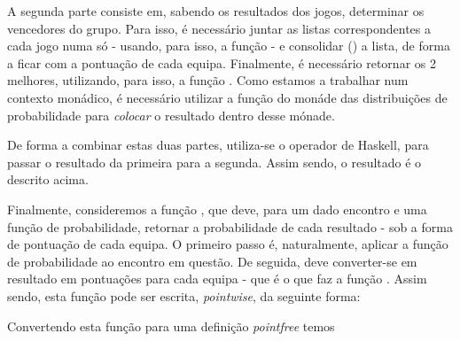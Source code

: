 \documentclass[a4paper]{article}
\begin{document}
A segunda parte consiste em, sabendo os resultados dos jogos, determinar os vencedores do grupo. Para isso, é necessário juntar as listas correspondentes a cada jogo numa só - usando, para isso, a função  - e consolidar () a lista, de forma a ficar com a pontuação de cada equipa. Finalmente, é necessário retornar os 2 melhores, utilizando, para isso, a função . Como estamos a trabalhar num contexto monádico, é necessário utilizar a função  do monáde das distribuições de probabilidade para \textit{colocar} o resultado dentro desse mónade.

De forma a combinar estas duas partes, utiliza-se o operador  de Haskell, para passar o resultado da primeira para a segunda. Assim sendo, o resultado é o descrito acima.


Finalmente, consideremos a função , que deve, para um dado encontro e uma função de probabilidade, retornar a probabilidade de cada resultado - sob a forma de pontuação de cada equipa. O primeiro passo é, naturalmente, aplicar a função de probabilidade ao encontro em questão. De seguida, deve converter-se em resultado em pontuações para cada equipa - que é o que faz a função . Assim sendo, esta função pode ser escrita, \textit{pointwise}, da seguinte forma:


Convertendo esta função para uma definição \textit{pointfree} temos



\printindex





\end{document}

